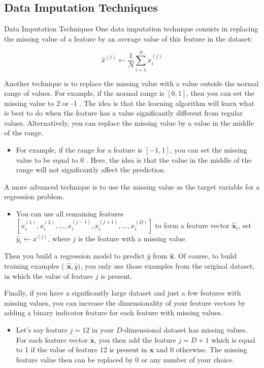 \documentclass[9pt,dvipsnames]{beamer}
\begin{document}
	\subsection{Data Imputation Techniques}
	\begin{frame}{Data Imputation Techniques}
		One data imputation technique consists in replacing the missing value of a feature by an average value of this feature in the dataset:
		
		$$
		\hat{x}^{(j)} \leftarrow \frac{1}{N} \sum_{i=1}^{N} x_{i}^{(j)}
		$$
		
		Another technique is to replace the missing value with a value outside the normal range of values. For example, if the normal range is $[0,1]$, then you can set the missing value to 2 or -1 . The idea is that the learning algorithm will learn what is best to do when the feature has a value significantly different from regular values. Alternatively, you can replace the missing value by a value in the middle of the range. 
		\begin{itemize}
			\item For example, if the range for a feature is $[-1,1]$, you can set the missing value to be equal to 0 . Here, the idea is that the value in the middle of the range will not significantly affect the prediction.
		\end{itemize}

	\end{frame}
	
	\begin{frame}
		A more advanced technique is to use the missing value as the target variable for a regression problem. 
		\begin{itemize}
			\item You can use all remaining features $\left[x_{i}^{(1)}, x_{i}^{(2)}, \ldots, x_{i}^{(j-1)}, x_{i}^{(j+1)}, \ldots, x_{i}^{(D)}\right]$ to form a feature vector $\hat{\mathbf{x}}_{i}$, set $\hat{y}_{i} \leftarrow x^{(j)}$, where $j$ is the feature with a missing value.
		\end{itemize}
		 Then you build a regression model to predict $\hat{y}$ from $\hat{\mathbf{x}}$. Of course, to build training examples ( $\hat{\mathbf{x}}, \hat{y})$, you only use those examples from the original dataset, in which the value of feature $j$ is present.
		
		Finally, if you have a significantly large dataset and just a few features with missing values, you can increase the dimensionality of your feature vectors by adding a binary indicator feature for each feature with missing values. 
		\begin{itemize}
			\item Let's say feature $j=12$ in your $D$-dimensional dataset has missing values. For each feature vector $\mathbf{x}$, you then add the feature $j=D+1$ which is equal to 1 if the value of feature 12 is present in $\mathbf{x}$ and 0 otherwise. The missing feature value then can be replaced by 0 or any number of your choice.
		\end{itemize}
	\end{frame}
	
\end{document}
